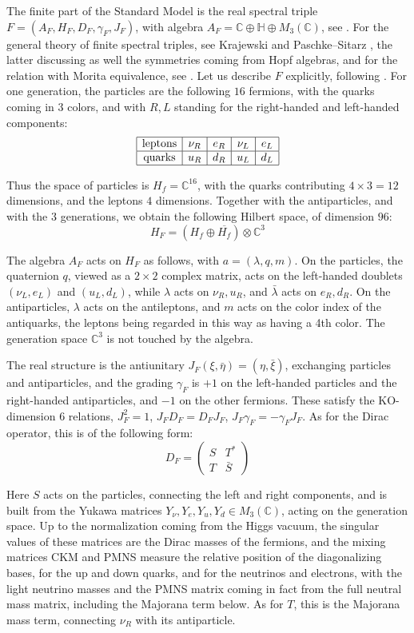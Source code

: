 \documentclass[11pt]{amsart}
\theoremstyle{definition}
\begin{document}
The finite part of the Standard Model is the real spectral triple $F=(A_F,H_F,D_F,\gamma_F,J_F)$, with algebra $A_F=\mathbb C\oplus\mathbb H\oplus M_3(\mathbb C)$, see \cite{cc2,ccm,con,cm,vsu}. For the general theory of finite spectral triples, see Krajewski \cite{kra} and Paschke--Sitarz \cite{psi}, the latter discussing as well the symmetries coming from Hopf algebras, and for the relation with Morita equivalence, see \cite{dda}. Let us describe $F$ explicitly, following \cite{ccm,vsu}. For one generation, the particles are the following $16$ fermions, with the quarks coming in $3$ colors, and with $R,L$ standing for the right-handed and left-handed components:
$$\begin{array}{|c|c|c|c|c|}
\hline
\text{leptons}&\nu_R&e_R&\nu_L&e_L\\
\hline
\text{quarks}&u_R&d_R&u_L&d_L\\
\hline
\end{array}$$

Thus the space of particles is $H_f=\mathbb C^{16}$, with the quarks contributing $4\times3=12$ dimensions, and the leptons $4$ dimensions. Together with the antiparticles, and with the $3$ generations, we obtain the following Hilbert space, of dimension $96$:
$$H_F=(H_f\oplus\overline{H_f})\otimes\mathbb C^3$$

The algebra $A_F$ acts on $H_F$ as follows, with $a=(\lambda,q,m)$. On the particles, the quaternion $q$, viewed as a $2\times2$ complex matrix, acts on the left-handed doublets $(\nu_L,e_L)$ and $(u_L,d_L)$, while $\lambda$ acts on $\nu_R,u_R$, and $\bar{\lambda}$ acts on $e_R,d_R$. On the antiparticles, $\lambda$ acts on the antileptons, and $m$ acts on the color index of the antiquarks, the leptons being regarded in this way as having a 4th color. The generation space $\mathbb C^3$ is not touched by the algebra.

The real structure is the antiunitary $J_F(\xi,\bar{\eta})=(\eta,\bar{\xi})$, exchanging particles and antiparticles, and the grading $\gamma_F$ is $+1$ on the left-handed particles and the right-handed antiparticles, and $-1$ on the other fermions. These satisfy the KO-dimension $6$ relations, $J_F^2=1$, $J_FD_F=D_FJ_F$, $J_F\gamma_F=-\gamma_FJ_F$. As for the Dirac operator, this is of the following form:
$$D_F=\begin{pmatrix}S&T^*\\ T&\bar{S}\end{pmatrix}$$

Here $S$ acts on the particles, connecting the left and right components, and is built from the Yukawa matrices $Y_\nu,Y_e,Y_u,Y_d\in M_3(\mathbb C)$, acting on the generation space. Up to the normalization coming from the Higgs vacuum, the singular values of these matrices are the Dirac masses of the fermions, and the mixing matrices CKM and PMNS measure the relative position of the diagonalizing bases, for the up and down quarks, and for the neutrinos and electrons, with the light neutrino masses and the PMNS matrix coming in fact from the full neutral mass matrix, including the Majorana term below. As for $T$, this is the Majorana mass term, connecting $\nu_R$ with its antiparticle.
\end{document}
